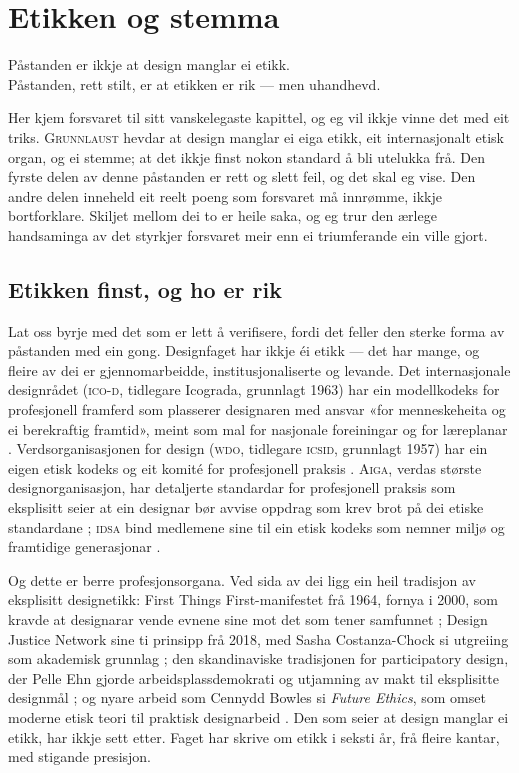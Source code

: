 \chapter{Etikken og stemma}

\begin{motto}
Påstanden er ikkje at design manglar ei etikk.\\ Påstanden, rett stilt, er at etikken er rik — men uhandhevd.
\end{motto}

Her kjem forsvaret til sitt vanskelegaste kapittel, og eg vil ikkje vinne det med eit triks. \textsc{Grunnlaust} hevdar at design manglar ei eiga etikk, eit internasjonalt etisk organ, og ei stemme; at det ikkje finst nokon standard å bli utelukka frå. Den fyrste delen av denne påstanden er rett og slett feil, og det skal eg vise. Den andre delen inneheld eit reelt poeng som forsvaret må innrømme, ikkje bortforklare. Skiljet mellom dei to er heile saka, og eg trur den ærlege handsaminga av det styrkjer forsvaret meir enn ei triumferande ein ville gjort.

\section{Etikken finst, og ho er rik}

Lat oss byrje med det som er lett å verifisere, fordi det feller den sterke forma av påstanden med ein gong. Designfaget har ikkje éi etikk — det har mange, og fleire av dei er gjennomarbeidde, institusjonaliserte og levande. Det internasjonale designrådet (\textsc{ico-d}, tidlegare Icograda, grunnlagt 1963) har ein modellkodeks for profesjonell framferd som plasserer designaren med ansvar «for menneskeheita og ei berekraftig framtid», meint som mal for nasjonale foreiningar og for læreplanar \autocite{icod_code}. Verdsorganisasjonen for design (\textsc{wdo}, tidlegare \textsc{icsid}, grunnlagt 1957) har ein eigen etisk kodeks og eit komité for profesjonell praksis \autocite{wdo_ethics}. \textsc{Aiga}, verdas største designorganisasjon, har detaljerte standardar for profesjonell praksis som eksplisitt seier at ein designar bør avvise oppdrag som krev brot på dei etiske standardane \autocite{aiga_standards}; \textsc{idsa} bind medlemene sine til ein etisk kodeks som nemner miljø og framtidige generasjonar \autocite{idsa_ethics}.

Og dette er berre profesjonsorgana. Ved sida av dei ligg ein heil tradisjon av eksplisitt designetikk: First Things First-manifestet frå 1964, fornya i 2000, som kravde at designarar vende evnene sine mot det som tener samfunnet \autocite{firstthings2000}; Design Justice Network sine ti prinsipp frå 2018, med Sasha Costanza-Chock si utgreiing som akademisk grunnlag \autocite{costanzachock2020}; den skandinaviske tradisjonen for participatory design, der Pelle Ehn gjorde arbeidsplassdemokrati og utjamning av makt til eksplisitte designmål \autocite{ehn1992scandinavian}; og nyare arbeid som Cennydd Bowles si \textit{Future Ethics}, som omset moderne etisk teori til praktisk designarbeid \autocite{bowles2018future}. Den som seier at design manglar ei etikk, har ikkje sett etter. Faget har skrive om etikk i seksti år, frå fleire kantar, med stigande presisjon.

